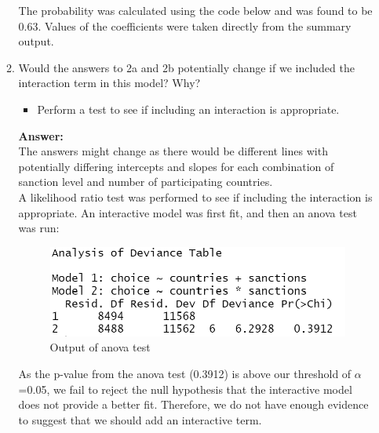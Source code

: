\documentclass[12pt,letterpaper]{article}
\begin{document}
\begin{enumerate}
\begin{enumerate}
		The probability was calculated using the code below and was found to be 0.63. Values of the coefficients were taken directly from the summary output.
		
		\vspace{.5cm}
		  
		\vspace{.5cm} 
		
		\item
		Would the answers to 2a and 2b potentially change if we included the interaction term in this model? Why? 
		\begin{itemize}
			\item Perform a test to see if including an interaction is appropriate.
		\end{itemize}
	\vspace{.5cm}
	\textbf{Answer:}\\
	
	The answers might change as there would be different lines with potentially differing intercepts and slopes for each combination of sanction level and number of participating countries.\\
	
	A likelihood ratio test was performed to see if including the interaction is appropriate. An interactive model was first fit, and then an anova test was run:
	
	\vspace{.5cm}
	  
	\vspace{.5cm} 
	
	\begin{figure}[H]\centering
		\caption{\footnotesize Output of anova test}
		\includegraphics[width=.75\textwidth]{anova output.png}
	\end{figure} 
	
	\vspace{.5cm}
	As the p-value from the anova test (0.3912) is above our threshold of $\alpha$=0.05, we fail to reject the null hypothesis that the interactive model does not provide a better fit. Therefore, we do not have enough evidence to suggest that we should add an interactive term.
	
	\end{enumerate}
	\end{enumerate}
\end{document}
